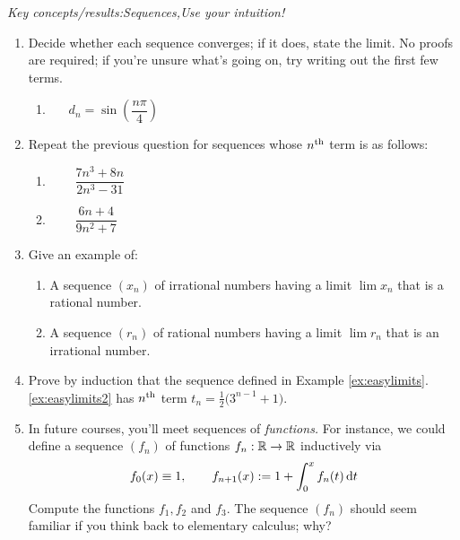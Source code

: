 

\begin{exercises}{}{}
	\emph{Key concepts/results:\quad Sequences,\quad Use your intuition!}
	
	\begin{enumerate}
	  \item%
	  Decide whether each sequence converges; if it does, state the limit. No proofs are required; if you're unsure what's going on, try writing out the first few terms.
		\begin{enumerate}
	    \item {}\ 
	    \ 
	    \ 
	    $d_n=\sin\left(\dfrac{n\pi}4\right)$
	  \end{enumerate}

	  
	  \item Repeat the previous question for sequences whose $n\textsuperscript{th}$ term is as follows:
	  \begin{enumerate}
	    \item {}\ 
	    \ 
	    \ 
	    \
			$\dfrac{7n^3+8n}{2n^3-31}$
	    \setcounter{enumii}{5}
	    \item {}\ 
	    \ 
	    \ 
	    \ 
	    $\dfrac{6n+4}{9n^2+7}$
	  \end{enumerate}

	  
	  \item Give an example of:
	  \begin{enumerate}
		  \item A sequence $(x_n)$ of irrational numbers having a limit $\lim x_n$ that is a rational number.
		  \item A sequence $(r_n)$ of rational numbers having a limit $\lim r_n$ that is an irrational number.
	  \end{enumerate}
	  
	  
	  \item Prove by induction that the sequence defined in Example \ref*{ex:easylimits}.\ref{ex:easylimits2} has $n\textsuperscript{th}$ term $t_n=\frac 12\bigl(3^{n-1}+1\bigr)$.
	  
	  
	  \item In future courses, you'll meet sequences of \emph{functions.} For instance,  we could define a sequence $(f_n)$ of functions $f_n:\mathbb{R}\to\mathbb{R}$ inductively via
	  \[
	  	f_0(x)\equiv 1,\qquad f_{n+1}(x):=1+\int_0^x f_n(t)\,{\mathrm{d} t}
	  \]
	  Compute the functions $f_1,f_2$ and $f_3$. The sequence $(f_n)$ should seem familiar if you think back to elementary calculus; why?
	\end{enumerate}
\end{exercises}


